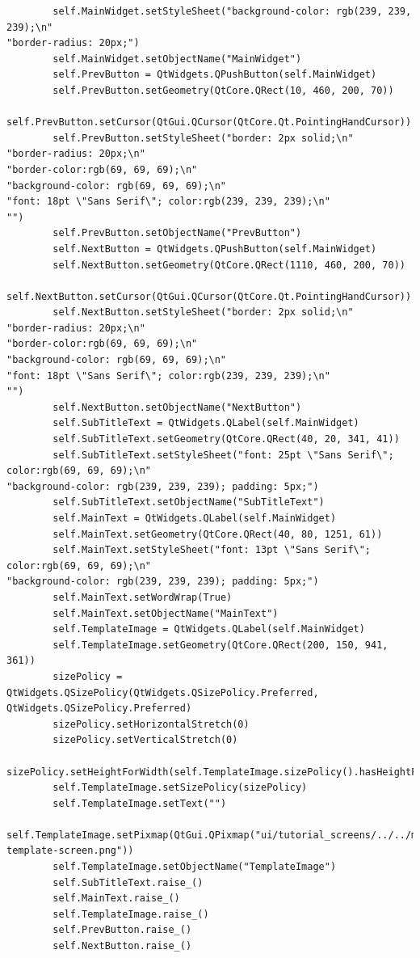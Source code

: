 \documentclass{article}
\begin{document}
\begin{lstlisting}
        self.MainWidget.setStyleSheet("background-color: rgb(239, 239, 239);\n"
"border-radius: 20px;")
        self.MainWidget.setObjectName("MainWidget")
        self.PrevButton = QtWidgets.QPushButton(self.MainWidget)
        self.PrevButton.setGeometry(QtCore.QRect(10, 460, 200, 70))
        self.PrevButton.setCursor(QtGui.QCursor(QtCore.Qt.PointingHandCursor))
        self.PrevButton.setStyleSheet("border: 2px solid;\n"
"border-radius: 20px;\n"
"border-color:rgb(69, 69, 69);\n"
"background-color: rgb(69, 69, 69);\n"
"font: 18pt \"Sans Serif\"; color:rgb(239, 239, 239);\n"
"")
        self.PrevButton.setObjectName("PrevButton")
        self.NextButton = QtWidgets.QPushButton(self.MainWidget)
        self.NextButton.setGeometry(QtCore.QRect(1110, 460, 200, 70))
        self.NextButton.setCursor(QtGui.QCursor(QtCore.Qt.PointingHandCursor))
        self.NextButton.setStyleSheet("border: 2px solid;\n"
"border-radius: 20px;\n"
"border-color:rgb(69, 69, 69);\n"
"background-color: rgb(69, 69, 69);\n"
"font: 18pt \"Sans Serif\"; color:rgb(239, 239, 239);\n"
"")
        self.NextButton.setObjectName("NextButton")
        self.SubTitleText = QtWidgets.QLabel(self.MainWidget)
        self.SubTitleText.setGeometry(QtCore.QRect(40, 20, 341, 41))
        self.SubTitleText.setStyleSheet("font: 25pt \"Sans Serif\"; color:rgb(69, 69, 69);\n"
"background-color: rgb(239, 239, 239); padding: 5px;")
        self.SubTitleText.setObjectName("SubTitleText")
        self.MainText = QtWidgets.QLabel(self.MainWidget)
        self.MainText.setGeometry(QtCore.QRect(40, 80, 1251, 61))
        self.MainText.setStyleSheet("font: 13pt \"Sans Serif\"; color:rgb(69, 69, 69);\n"
"background-color: rgb(239, 239, 239); padding: 5px;")
        self.MainText.setWordWrap(True)
        self.MainText.setObjectName("MainText")
        self.TemplateImage = QtWidgets.QLabel(self.MainWidget)
        self.TemplateImage.setGeometry(QtCore.QRect(200, 150, 941, 361))
        sizePolicy = QtWidgets.QSizePolicy(QtWidgets.QSizePolicy.Preferred, QtWidgets.QSizePolicy.Preferred)
        sizePolicy.setHorizontalStretch(0)
        sizePolicy.setVerticalStretch(0)
        sizePolicy.setHeightForWidth(self.TemplateImage.sizePolicy().hasHeightForWidth())
        self.TemplateImage.setSizePolicy(sizePolicy)
        self.TemplateImage.setText("")
        self.TemplateImage.setPixmap(QtGui.QPixmap("ui/tutorial_screens/../../media/annotated-template-screen.png"))
        self.TemplateImage.setObjectName("TemplateImage")
        self.SubTitleText.raise_()
        self.MainText.raise_()
        self.TemplateImage.raise_()
        self.PrevButton.raise_()
        self.NextButton.raise_()


\end{lstlisting}
\end{document}
